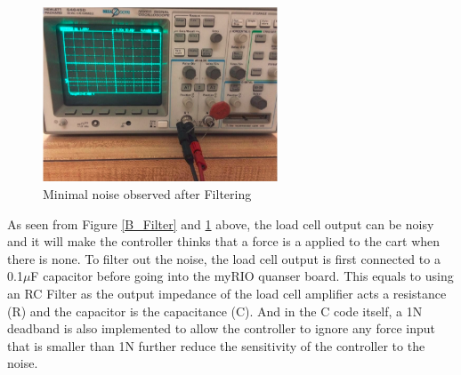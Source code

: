 \begin{figure}[htbp]
\begin{center}
\includegraphics[width=2.75in]{Images/After_Filter.PNG}
\caption{Minimal noise observed after Filtering}
\label{A_Filter}
\end{center}
\end{figure}
As seen from Figure \ref{B_Filter} and \ref{A_Filter} above, the load cell output can be noisy and it will make the controller thinks that a force is a applied to the cart when there is none. To filter out the noise, the load cell output is first connected to a 0.1$\mu$F capacitor before going into the myRIO quanser board. This equals to using an RC Filter as the output impedance of the load cell amplifier acts a resistance (R) and the capacitor is the capacitance (C). And in the C code itself, a 1N deadband is also implemented to allow the controller to ignore any force input that is smaller than 1N further reduce the sensitivity of the controller to the noise.
